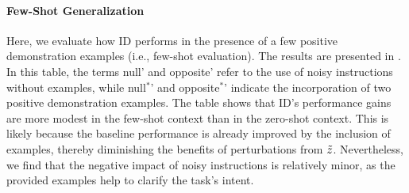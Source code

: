 \paragraph{Few-Shot Generalization}

Here, we evaluate how ID performs in the presence of a few positive demonstration examples (i.e., few-shot evaluation).  The results are presented in . In this table, the terms null' and opposite' refer to the use of noisy instructions without examples, while null$^*$' and opposite$^*$' indicate the incorporation of two positive demonstration examples. The table shows that ID's performance gains are more modest in the few-shot context than in the zero-shot context. This is likely because the baseline performance is already improved by the inclusion of examples, thereby diminishing the benefits of perturbations from $\Tilde{z}$. Nevertheless, we find that the negative impact of noisy instructions is relatively minor, as the provided examples help to clarify the task's intent.
